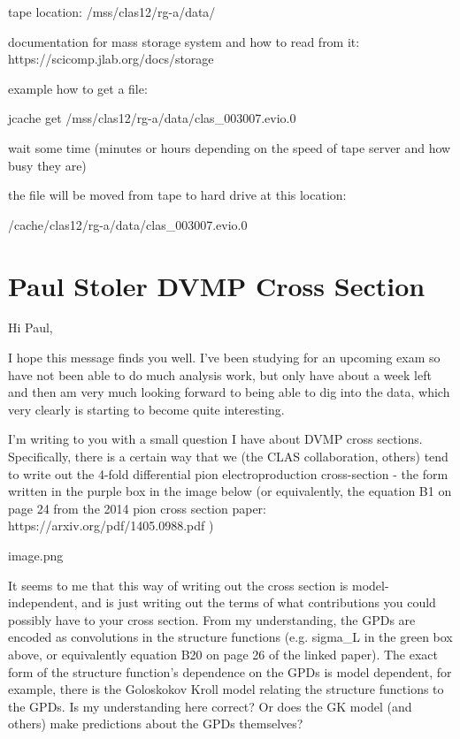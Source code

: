     tape location: /mss/clas12/rg-a/data/
    
    documentation for mass storage system and how to read from it: https://scicomp.jlab.org/docs/storage
    
     
    
    example how to get a file:
    
    jcache get /mss/clas12/rg-a/data/clas_003007.evio.0
    
    wait some time (minutes or hours depending on the speed of tape server and how busy they are)
    
    the file will be moved from tape to hard drive at this location:
    
    /cache/clas12/rg-a/data/clas_003007.evio.0
    
    
\section{Paul Stoler DVMP Cross Section}
    Hi Paul,
    
    I hope this message finds you well. I've been studying for an upcoming exam so have not been able to do much analysis work, but only have about a week left and then am very much looking forward to being able to dig into the data, which very clearly is starting to become quite interesting. 
    
    I'm writing to you with a small question I have about DVMP cross sections. Specifically, there is a certain way that we (the CLAS collaboration, others) tend to write out the 4-fold differential pion electroproduction cross-section - the form written in the purple box in the image below (or equivalently, the equation B1 on page 24 from the 2014 pion cross section paper: https://arxiv.org/pdf/1405.0988.pdf ) 
    
    image.png
    
    It seems to me that this way of writing out the cross section is model-independent, and is just writing out the terms of what contributions you could possibly have to your cross section. From my understanding, the GPDs are encoded as convolutions in the structure functions (e.g. sigma_L  in the green box above, or equivalently equation B20 on page 26 of the linked paper). The exact form of the structure function's dependence on the GPDs is model dependent, for example, there is the Goloskokov Kroll model relating the structure functions to the GPDs. Is my understanding here correct? Or does the GK model (and others) make predictions about the GPDs themselves?
    
